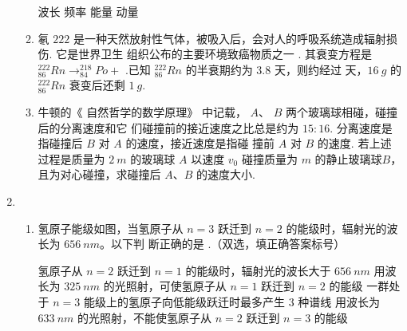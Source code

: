 \begin{enumerate}
\begin{enumerate}
\fourchoices
{波长}
{频率}
{能量}
{动量}




\item 
氡 $ 222 $ 是一种天然放射性气体，被吸入后，会对人的呼吸系统造成辐射损伤. 它是世界卫生
组织公布的主要环境致癌物质之一 . 其衰变方程是 $ ^{222}_{86}Rn \rightarrow ^{218}_{84}Po + $ \underlinegap .已知 $ ^{222}_{86}Rn $ 的半衰期约为
$ 3.8 $ 天，则约经过
 \underlinegap 
天，$ 16 \ g $ 的$ ^{222}_{86}Rn $ 衰变后还剩 $ 1 \ g $.



\item 
 牛顿的《 自然哲学的数学原理》 中记载， $ A $、 $ B $ 两个玻璃球相碰，碰撞后的分离速度和它
们碰撞前的接近速度之比总是约为 $ 15 : 16 $. 分离速度是指碰撞后 $ B $ 对 $ A $ 的速度，接近速度是指碰
撞前 $ A $ 对 $ B $ 的速度. 若上述过程是质量为 $ 2 \ m $ 的玻璃球 $ A $ 以速度 $ v_{0} $ 碰撞质量为 $ m $ 的静止玻璃球$ B $，且为对心碰撞，求碰撞后 $ A $、$ B $ 的速度大小.



	
\end{enumerate}

\item 
{}
\begin{enumerate}
	\item
氢原子能级如图，当氢原子从 $ n=3 $ 跃迁到 $ n=2 $ 的能级时，辐射光的波长为 $ 656 \ nm $。以下判
断正确的是 \underlinegap .（双选，填正确答案标号）
\begin{figure}[h!]
	\centering
	
\end{figure}

\fourchoices
{氢原子从 $ n=2 $ 跃迁到 $ n=1 $ 的能级时，辐射光的波长大于 $ 656 \ nm $}
{用波长为 $ 325 \ nm $ 的光照射，可使氢原子从 $ n=1 $ 跃迁到 $ n=2 $ 的能级}
{一群处于 $ n=3 $ 能级上的氢原子向低能级跃迁时最多产生 $ 3 $ 种谱线}
{用波长为 $ 633 \ nm $ 的光照射，不能使氢原子从 $ n=2 $ 跃迁到 $ n=3 $ 的能级}




\end{enumerate}
\end{enumerate}
